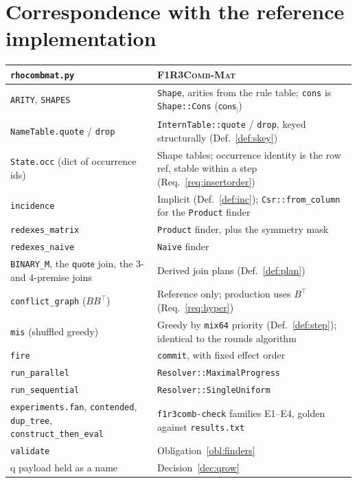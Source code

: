 \documentclass[11pt,a4paper]{article}
\newcommand{\code}[1]{\texttt{#1}}
\newcommand{\Mat}{\textsc{F1R3Comb-Mat}}
\newcommand{\cons}{\mathsf{cons}}
\theoremstyle{definition}
\theoremstyle{plain}
\begin{document}
\appendix
\section{Correspondence with the reference implementation}\label{app:corr}

\begin{center}\small
\begin{tabularx}{\linewidth}{@{}l>{\raggedright\arraybackslash}X@{}}
\toprule
\code{rhocombmat.py} & \Mat\\
\midrule
\code{ARITY}, \code{SHAPES} & \code{Shape}, arities from the rule table;
\code{cons} is \code{Shape::Cons} ($\cons_{\mid}$)\\
\code{NameTable.quote} / \code{drop} & \code{InternTable::quote} /
\code{drop}, keyed structurally (Def.~\ref{def:skey})\\
\code{State.occ} (dict of occurrence ids) & Shape tables; occurrence identity
is the row ref, stable within a step (Req.~\ref{req:insertorder})\\
\code{incidence} & Implicit (Def.~\ref{def:inc});
\code{Csr::from\_column} for the \code{Product} finder\\
\code{redexes\_matrix} & \code{Product} finder, plus the symmetry mask\\
\code{redexes\_naive} & \code{Naive} finder\\
\code{BINARY\_M}, the $\mathsf{quote}$ join, the 3- and 4-premise
joins & Derived join plans (Def.~\ref{def:plan})\\
\code{conflict\_graph} ($BB^{\top}$) & Reference only; production uses
$B^{\top}$ (Req.~\ref{req:hyper})\\
\code{mis} (shuffled greedy) & Greedy by \code{mix64} priority
(Def.~\ref{def:step}); identical to the rounds algorithm\\
\code{fire} & \code{commit}, with fixed effect order\\
\code{run\_parallel} & \code{Resolver::MaximalProgress}\\
\code{run\_sequential} & \code{Resolver::SingleUniform}\\
\code{experiments.fan}, \code{contended}, \code{dup\_tree},
\code{construct\_then\_eval} & \code{f1r3comb-check} families E1--E4, golden
against \code{results.txt}\\
\code{validate} & Obligation~\ref{obl:finders}\\
q payload held as a name & Decision~\ref{dec:qrow}\\
\bottomrule
\end{tabularx}
\end{center}
\end{document}
